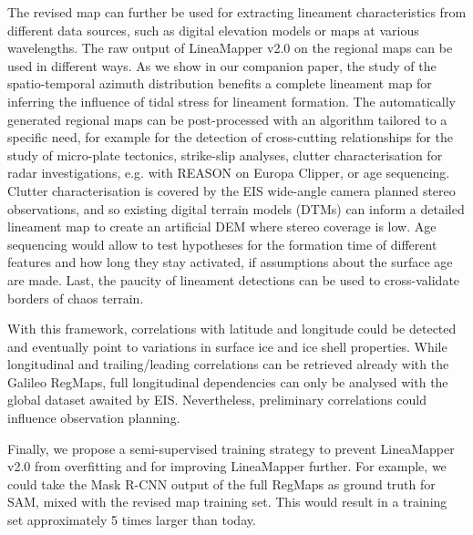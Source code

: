 The revised map can further be used for extracting lineament characteristics from different data sources, such as digital elevation models or maps at various wavelengths. 
The raw output of LineaMapper v2.0 on the regional maps can be used in different ways. As we show in our companion paper, the study of the spatio-temporal azimuth distribution benefits a complete lineament map for inferring the influence of tidal stress for lineament formation. 
The automatically generated regional maps can be post-processed with an algorithm tailored to a specific need, for example for the detection of cross-cutting relationships for the study of micro-plate tectonics, strike-slip analyses, clutter characterisation for radar investigations, e.g. with REASON on Europa Clipper, or age sequencing. Clutter characterisation is covered by the EIS wide-angle camera planned stereo observations, and so existing digital terrain models (DTMs) can inform a detailed lineament map to create an artificial DEM where stereo coverage is low. Age sequencing would allow to test hypotheses for the formation time of different features and how long they stay activated, if assumptions about the surface age are made. %
Last, the paucity of lineament detections can be used to cross-validate borders of chaos terrain.

With this framework, correlations with latitude and longitude could be detected and eventually point to variations in surface ice and ice shell properties. While longitudinal and trailing/leading correlations can be retrieved already with the Galileo RegMaps, full longitudinal dependencies can only be analysed with the global dataset awaited by EIS. Nevertheless, preliminary correlations could influence observation planning.

Finally, we propose a semi-supervised training strategy to prevent LineaMapper v2.0 from overfitting and for improving LineaMapper further. For example, we could take the Mask R-CNN output of the full RegMaps as ground truth for SAM, mixed with the revised map training set. This would result in a training set approximately 5 times larger than today.


